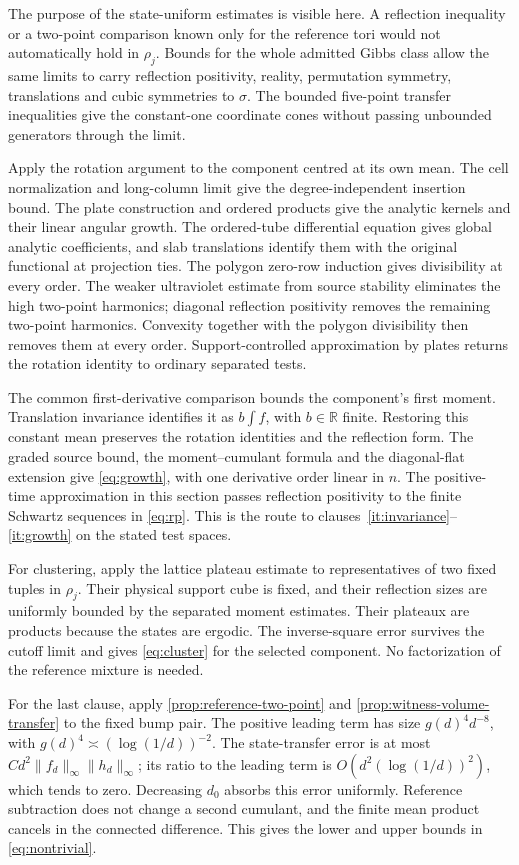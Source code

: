 \documentclass[11pt,letterpaper,reqno]{amsart}
\theoremstyle{definition}
\theoremstyle{remark}
\newcommand{\R}{\mathbb R}
\begin{document}
The purpose of the state-uniform estimates is visible here. A
reflection inequality or a two-point comparison known only for the
reference tori would not automatically hold in $\rho_j$. Bounds for
the whole admitted Gibbs class allow the same limits to carry
reflection positivity, reality, permutation symmetry, translations
and cubic symmetries to $\sigma$. The bounded five-point transfer
inequalities give the constant-one coordinate cones without passing
unbounded generators through the limit.

Apply the rotation argument to the component centred at its own
mean. The cell normalization and long-column limit give the
degree-independent insertion bound. The plate construction and
ordered products give the analytic kernels and their linear angular
growth. The ordered-tube differential equation gives global analytic
coefficients, and slab translations identify them with the original
functional at projection ties. The polygon zero-row induction gives
divisibility at every order. The weaker ultraviolet estimate from
source stability eliminates the high two-point harmonics;
diagonal reflection positivity removes the remaining two-point
harmonics. Convexity together with the polygon divisibility then
removes them at every order. Support-controlled approximation by
plates returns the rotation identity to ordinary separated tests.

The common first-derivative comparison bounds the component's first
moment. Translation invariance identifies it as $b\int f$, with
$b\in\R$ finite. Restoring this constant mean preserves the rotation
identities and the reflection form. The graded source bound, the
moment--cumulant formula and the diagonal-flat extension give
\eqref{eq:growth}, with one derivative order linear in $n$.
The positive-time approximation in this section passes reflection
positivity to the finite Schwartz sequences in \eqref{eq:rp}.
This is the route to clauses~\ref{it:invariance}--\ref{it:growth}
on the stated test spaces.

For clustering, apply the lattice plateau estimate to representatives
of two fixed tuples in $\rho_j$. Their physical support cube is fixed,
and their reflection sizes are uniformly bounded by the separated
moment estimates. Their plateaux are products because the states are
ergodic. The inverse-square error survives the cutoff limit and gives
\eqref{eq:cluster} for the selected component. No factorization of
the reference mixture is needed.

For the last clause, apply \cref{prop:reference-two-point} and
\cref{prop:witness-volume-transfer} to the fixed
bump pair. The positive leading term has size $g(d)^4d^{-8}$, with
$g(d)^4\asymp(\log(1/d))^{-2}$. The state-transfer error is at most
$Cd^2\|f_d\|_\infty\|h_d\|_\infty$; its ratio to the leading term
is $O(d^2(\log(1/d))^2)$, which tends to zero. Decreasing $d_0$
absorbs this error uniformly. Reference subtraction does not change
a second cumulant, and the finite mean product cancels in the
connected difference. This gives the lower and upper bounds in
\eqref{eq:nontrivial}.
\end{document}
